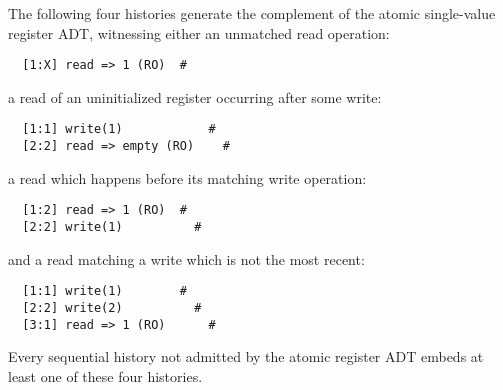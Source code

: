 \begin{example}
  \label{ex:patterns}

  The following four histories generate the complement of the atomic
  single-value register ADT, witnessing either an unmatched read operation:
\begin{verbatim}
  [1:X] read => 1 (RO)  #
\end{verbatim}
  a read of an uninitialized register occurring after some write:
\begin{verbatim}
  [1:1] write(1)            #
  [2:2] read => empty (RO)    #
\end{verbatim}
  a read which happens before its matching write operation:
\begin{verbatim}
  [1:2] read => 1 (RO)  #
  [2:2] write(1)          #
\end{verbatim}
  and a read matching a write which is not the most recent:
\begin{verbatim}
  [1:1] write(1)        #
  [2:2] write(2)          #
  [3:1] read => 1 (RO)      #
\end{verbatim}
  Every sequential history not admitted by the atomic register ADT embeds at
  least one of these four histories.
  
\end{example}
